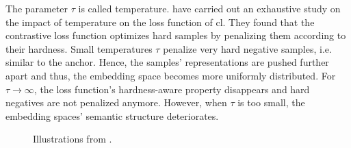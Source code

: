 
The parameter $\tau$ is called temperature.
\citet{wang_understanding_2021} have carried out an exhaustive study on the impact of temperature on the loss function of \ac{cl}.
They found that the contrastive loss function optimizes hard samples by penalizing them according to their hardness.
Small temperatures $\tau$ penalize very hard negative samples, i.e. similar to the anchor.
Hence, the samples' representations are pushed further apart and thus, the embedding space becomes more uniformly distributed.
For $\tau \rightarrow \infty$, the loss function's hardness-aware property disappears and hard negatives are not penalized anymore.
However, when $\tau$ is too small, the embedding spaces' semantic structure deteriorates.


\begin{figure}%
    \centering
    \qquad
    \caption{Illustrations from \citet{wang_understanding_2021}.}%
    \label{fig:temperature}%
\end{figure}


